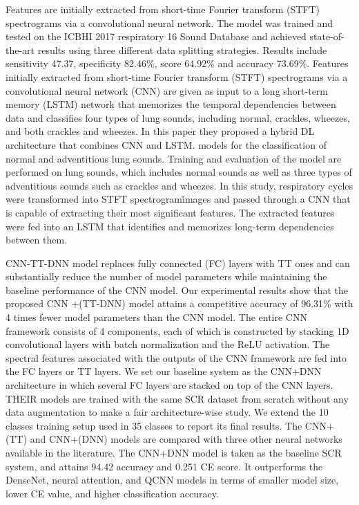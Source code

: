 \parencite{14} Features are initially extracted from short-time Fourier transform (STFT) spectrograms via a convolutional neural network. The model was trained and tested on the ICBHI 2017 respiratory 16 Sound Database and achieved state-of-the-art results using three different data splitting strategies. Results include sensitivity 47.37, specificity 82.46\%, score 64.92\% and accuracy 73.69\%. Features initially extracted from short-time Fourier transform (STFT) spectrograms via a convolutional neural network (CNN) are given as input to a long short-term memory (LSTM) network that memorizes the temporal dependencies between data and classifies four types of lung sounds, including normal, crackles, wheezes, and both crackles and wheezes. In this paper they proposed a hybrid DL architecture that combines CNN and LSTM. models for the classification of normal and adventitious lung sounds. Training and evaluation of the model are performed on lung sounds, which includes normal sounds as well as three types of adventitious sounds such as crackles and wheezes. In this study, respiratory cycles were transformed into STFT spectrogram\r images and passed through a CNN that is capable of extracting their most significant features. The extracted features were fed into an LSTM that identifies and memorizes long-term dependencies between them.
 
CNN-TT-DNN \parencite{15} model replaces fully connected (FC) layers with TT ones and can substantially reduce the number of model parameters while maintaining the baseline performance of the CNN model. Our experimental results show that the proposed CNN +(TT-DNN) model attains a competitive accuracy of 96.31\% with 4 times fewer model parameters than the CNN model. The entire CNN framework consists of 4 components, each of which is constructed by stacking 1D convolutional layers with batch normalization and the ReLU activation. The spectral features associated with the outputs of the CNN framework are fed into the FC layers or TT layers. We set our baseline system as the CNN+DNN architecture in which several FC layers are stacked on top of the CNN layers. THEIR models are trained with the same SCR dataset from scratch without any data augmentation to make a fair architecture-wise study. We extend the 10 classes training setup used in 35 classes to report its final results. The CNN+(TT) and CNN+(DNN) models are compared with three other neural networks available in the literature. The CNN+DNN model is taken as the baseline SCR system, and attains 94.42 accuracy and 0.251 CE score. It outperforms the DenseNet, neural attention, and QCNN models in terms of smaller model size, lower CE value, and higher classification accuracy. 

